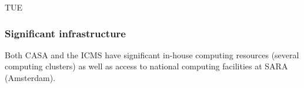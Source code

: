 \begin{sitedescription}{TUE}
\subsubsection*{Significant infrastructure}

{Both CASA and the ICMS have significant in-house computing resources (several computing clusters) as well as access to national computing facilities at SARA (Amsterdam).}
\end{sitedescription}

